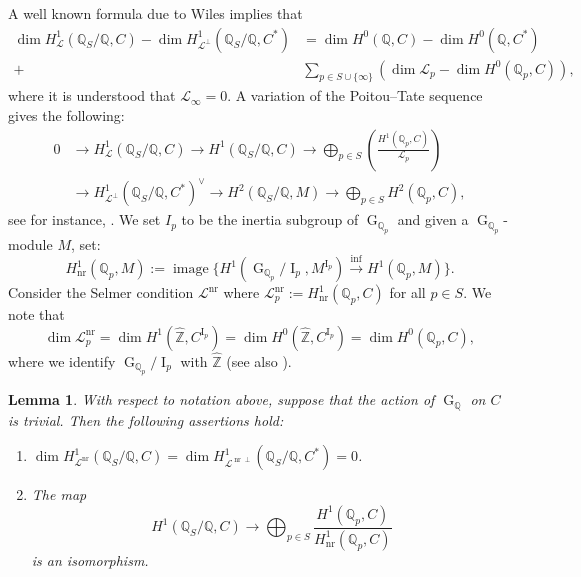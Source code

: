 \documentclass[11pt,reqno]{amsart}
\newtheorem{lemma}[theorem]{Lemma}
\newcommand{\Z}{\mathbb{Z}}
\newcommand{\Q}{\mathbb{Q}}
\newcommand{\cL}{\mathcal{L}}
\newcommand{\op}[1]{\operatorname{#1}}
\numberwithin{equation}{section}
\begin{document}
A well known formula due to Wiles implies that 
\begin{equation}\label{Wiles formula}\begin{split}\dim H^1_{\cL}(\Q_S/\Q, C)-\dim H^1_{\cL^\perp}(\Q_S/\Q, C^*)&= \dim H^0(\Q, C)-\dim H^0(\Q, C^*) \\ 
+& \sum_{p\in S\cup\{\infty\}} \left(\dim \cL_p- \dim H^0(\Q_p, C)\right),
\end{split}\end{equation}
where it is understood that $\cL_\infty=0$. A variation of the Poitou--Tate sequence gives the following:
\begin{equation}\label{PT les}
    \begin{split}
        0 &\rightarrow  H^1_{\cL}(\Q_S/\Q, C)\rightarrow H^1(\Q_{S}/\Q, C)\rightarrow \bigoplus_{p\in S} \left(\frac{H^1(\Q_p, C)}{\cL_p}\right) \\
        & \rightarrow H^1_{\cL^\perp}(\Q_S/\Q, C^*)^\vee\rightarrow H^2(\Q_S/\Q, M)\rightarrow \bigoplus_{p\in S} H^2(\Q_p, C),
    \end{split}
\end{equation}
see for instance, \cite[p.~555, l.7]{tayloricosahedral}. We set $I_p$ to be the inertia subgroup of $\op{G}_{\Q_p}$ and given a $\op{G}_{\Q_p}$-module $M$, set:
\[H^1_{\op{nr}}(\Q_p, M):=\op{image}\{H^1(\op{G}_{\Q_p}/\op{I}_p, M^{\op{I}_p})\xrightarrow{\op{inf}} H^1(\Q_p, M)\}.\]
Consider the Selmer condition $\cL^{\op{nr}}$ where $\cL_p^{\op{nr}}:=H^1_{\op{nr}}(\Q_p, C)$ for all $p\in S$. We note that \begin{equation}\label{unram local dimension}\dim \cL_p^{\op{nr}}=\dim H^1(\widehat{\Z}, C^{\op{I}_p})=\dim H^0(\widehat{\Z}, C^{\op{I}_p})=\dim H^0(\Q_p, C),\end{equation}where we identify $\op{G}_{\Q_p}/\op{I}_p$ with $\widehat{\Z}$ (see also \cite[Lemma 3]{raviFM}). 
\begin{lemma}\label{Selmer and dual Selmer vanishing}
    With respect to notation above, suppose that the action of $\op{G}_{\Q}$ on $C$ is trivial. Then the following assertions hold:
    \begin{enumerate}
        \item $\dim H^1_{\cL^{\op{nr}}}(\Q_S/\Q, C)=\dim H^1_{\cL^{\op{nr}\perp}}(\Q_S/\Q, C^*)=0$.
        \item The map 
        \begin{equation}\label{Selmer map iso} H^1(\Q_S/\Q, C)\longrightarrow \bigoplus_{p\in S} \frac{H^1(\Q_p, C)}{H^1_{\op{nr}}(\Q_p, C)}\end{equation} is an isomorphism. 
    \end{enumerate}
\end{lemma}
\end{document}
